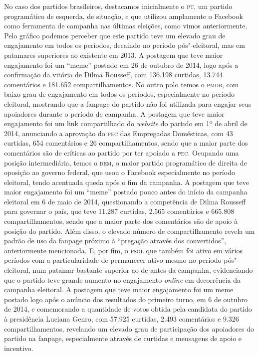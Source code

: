 No caso dos partidos brasileiros, destacamos inicialmente o \textsc{pt}, um
partido programático de esquerda, de situação, e que utilizou amplamente
o Facebook como ferramenta de campanha nas últimas eleições, como vimos
anteriormente. Pelo gráfico podemos perceber que este partido teve um
elevado grau de engajamento em todos os períodos, decaindo no período
pós"-eleitoral, mas em patamares superiores ao existente em 2013. A
postagem que teve maior engajamento foi um ``meme'' postado em
26 de outubro de 2014, logo após a confirmação da vitória de Dilma Rousseff, com
136.198 curtidas, 13.744 comentários e 181.652 compartilhamentos. No
outro polo temos o \textsc{pmdb}, com baixo grau de engajamento em todos os
períodos, especialmente no período eleitoral, mostrando que a fanpage do
partido não foi utilizada para engajar seus apoiadores durante o período
de campanha. A postagem que teve maior engajamento foi um link
compartilhado do \textit{website} do partido em 1º de abril de 2014, anunciando a
aprovação do \textsc{pec} das Empregadas Domésticas, com 43 curtidas, 654
comentários e 26 compartilhamentos, sendo que a maior parte dos
comentários são de críticas ao partido por ter apoiado a \textsc{pec}. Ocupando
uma posição intermediária, temos o \textsc{dem}, o maior partido programático de
direita de oposição ao governo federal, que usou o Facebook
especialmente no período eleitoral, tendo acentuada queda após o fim da
campanha. A postagem que teve maior engajamento foi um ``meme'' postado
pouco antes do início da campanha eleitoral em 6 de maio de 2014, questionando
a competência de Dilma Rousseff para governar o país, que teve 11.287
curtidas, 2.565 comentários e 665.808 compartilhamentos, sendo que a
maior parte dos comentários são de apoio à posição do partido. Além
disso, o elevado número de compartilhamento revela um padrão de uso da
fanpage próximo à ``pregação através dos convertidos'', anteriormente
mencionada. E, por fim, o \textsc{psol} que também foi ativo em vários períodos
com a particularidade de permanecer ativo mesmo no período
pós"-eleitoral, num patamar bastante superior ao de antes da campanha,
evidenciando que o partido teve grande aumento no engajamento \textit{online} em
decorrência da campanha eleitoral. A postagem que teve maior engajamento
foi um meme postado logo após o anúncio dos resultados do primeiro
turno, em 6 de outubro de 2014, e comemorando a quantidade de votos obtida pela
candidata do partido à presidência Luciana Genro, com 57.925 curtidas,
2.493 comentários e 9.326 compartilhamentos, revelando um
elevado grau de participação dos apoiadores do partido na fanpage,
especialmente através de curtidas e mensagens de apoio e incentivo.

